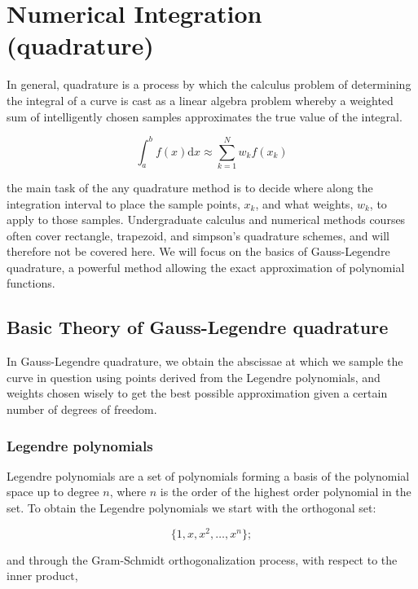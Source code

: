 \section{Numerical Integration (quadrature)}
\label{sec:quadrature}

In general, quadrature is a process by which the calculus problem of determining the integral of a curve is cast as a linear algebra problem whereby a weighted sum of intelligently chosen samples approximates the true value of the integral.

\begin{equation}
    \label{eqn:quadrature}
    \int_{a}^{b} f(x) \mathrm{d}x \approx \sum_{k=1}^N w_k f(x_k)
\end{equation}

\where the main task of the any quadrature method is to decide where along the integration interval to place the sample points, \(x_k\), and what weights, \(w_k\), to apply to those samples.
%
Undergraduate calculus and numerical methods courses often cover rectangle, trapezoid, and simpson's quadrature schemes, and will therefore not be covered here.
%
We will focus on the basics of Gauss-Legendre quadrature, a powerful method allowing the exact approximation of polynomial functions.

\subsection{Basic Theory of Gauss-Legendre quadrature}
In Gauss-Legendre quadrature, we obtain the abscissae at which we sample the curve in question using points derived from the Legendre polynomials, and weights chosen wisely to get the best possible approximation given a certain number of degrees of freedom.

\subsubsection{Legendre polynomials}

Legendre polynomials are a set of polynomials forming a basis of the polynomial space up to degree \(n\), where \(n\) is the order of the highest order polynomial in the set.
%
To obtain the Legendre polynomials we start with the orthogonal set:

\begin{equation}
    \{ 1, x, x^2, \ldots , x^n \};
\end{equation}

\noindent and through the Gram-Schmidt orthogonalization process, with respect to the inner product,

